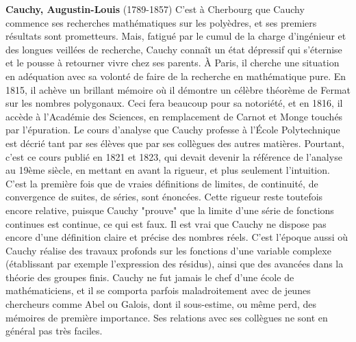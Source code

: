 \textbf{Cauchy, Augustin-Louis} (1789-1857) C'est à Cherbourg que Cauchy commence ses recherches mathématiques sur les polyèdres, et ses premiers résultats sont prometteurs. Mais, fatigué par le cumul de la charge d'ingénieur et des longues veillées de recherche, Cauchy connaît un état dépressif qui s'éternise et le pousse à retourner vivre chez ses parents. À Paris, il cherche une situation en adéquation avec sa volonté de faire de la recherche en mathématique pure. En 1815, il achève un brillant mémoire où il démontre un célèbre théorème de Fermat sur les nombres polygonaux. Ceci fera beaucoup pour sa notoriété, et en 1816, il accède à l'Académie des Sciences, en remplacement de Carnot et Monge touchés par l'épuration. Le cours d'analyse que Cauchy professe à l'École Polytechnique est décrié tant par ses élèves que par ses collègues des autres matières. Pourtant, c'est ce cours publié en 1821 et 1823, qui devait devenir la référence de l'analyse au 19ème siècle, en mettant en avant la rigueur, et plus seulement l'intuition. C'est la première fois que de vraies définitions de limites, de continuité, de convergence de suites, de séries, sont énoncées. Cette rigueur reste toutefois encore relative, puisque Cauchy "prouve" que la limite d'une série de fonctions continues est continue, ce qui est faux. Il est vrai que Cauchy ne dispose pas encore d'une définition claire et précise des nombres réels. C'est l'époque aussi où Cauchy réalise des travaux profonds sur les fonctions d'une variable complexe (établissant par exemple l'expression des résidus), ainsi que des avancées dans la théorie des groupes finis. Cauchy ne fut jamais le chef d'une école de mathématiciens, et il se comporta parfois maladroitement avec de jeunes chercheurs comme Abel ou Galois, dont il sous-estime, ou même perd, des mémoires de première importance. Ses relations avec ses collègues ne sont en général pas très faciles.

